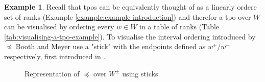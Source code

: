 \documentclass[11pt]{scrartcl}
\theoremstyle{definition}
\newtheorem{example}{Example}[section]
\begin{document}
\begin{example}
    \label{example:example-stick}
    Recall that tpos can be equivalently thought of as a linearly ordere set of ranks (Example \ref{example:example-introduction}) and therefor a tpo over $W$ can be visualised by ordering every $w \in W$ in a table of ranks (Table \ref{tab:visualising-a-tpo-example}). To visualise the interval ordering introduced by $\preceq$ Booth and Meyer use a "stick" with the endpoints defined as $w^{+}$/$w^{-}$ respectively, first introduced in \cite{Booth2007}. 
    
    \begin{figure}
        \centering
        \label{plot:example-visualisation-scatterplot}
            \caption{Representation of $\preceq$ over $W^{\pm}$ using sticks}
    \end{figure}
\end{example}

\end{document}
